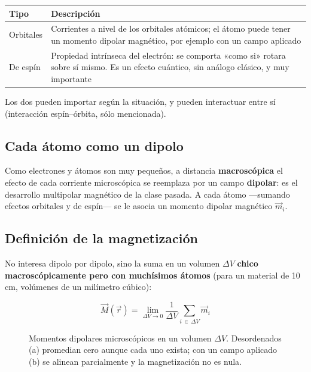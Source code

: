 \documentclass[12pt,a4paper]{article}
\begin{document}
\begin{center}
\renewcommand{\arraystretch}{1.35}
\small
\begin{tabularx}{\textwidth}{l>{\raggedright\arraybackslash}X}
\toprule
\textbf{Tipo} & \textbf{Descripción} \\
\midrule
Orbitales & Corrientes a nivel de los orbitales atómicos; el átomo puede tener un momento dipolar magnético, por ejemplo con un campo aplicado \\
De espín & Propiedad intrínseca del electrón: se comporta «como si» rotara sobre sí mismo. Es un efecto cuántico, sin análogo clásico, y muy importante \\
\bottomrule
\end{tabularx}
\end{center}

Los dos pueden importar según la situación, y pueden interactuar entre sí
(interacción espín--órbita, sólo mencionada).

\subsection{Cada átomo como un dipolo}

Como electrones y átomos son muy pequeños, a distancia \textbf{macroscópica} el
efecto de cada corriente microscópica se reemplaza por un campo \textbf{dipolar}:
es el desarrollo multipolar magnético de la clase pasada. A cada átomo ---sumando
efectos orbitales y de espín--- se le asocia un momento dipolar magnético
$\vec m_i$.

\subsection{Definición de la magnetización}

No interesa dipolo por dipolo, sino la suma en un volumen $\Delta V$ \textbf{chico
macroscópicamente pero con muchísimos átomos} (para un material de 10 cm,
volúmenes de un milímetro cúbico):

\begin{keybox}
\[
\boxed{\ \vec M(\vec r) = \lim_{\Delta V\to0}\frac{1}{\Delta V}
\sum_{i\,\in\,\Delta V}\vec m_i\ }
\]
\end{keybox}

\begin{figure}[H]
  \centering
  
  \caption{Momentos dipolares microscópicos en un volumen $\Delta V$. Desordenados (a) promedian cero aunque cada uno exista; con un campo aplicado (b) se alinean parcialmente y la magnetización no es nula.}
\end{figure}
\end{document}
